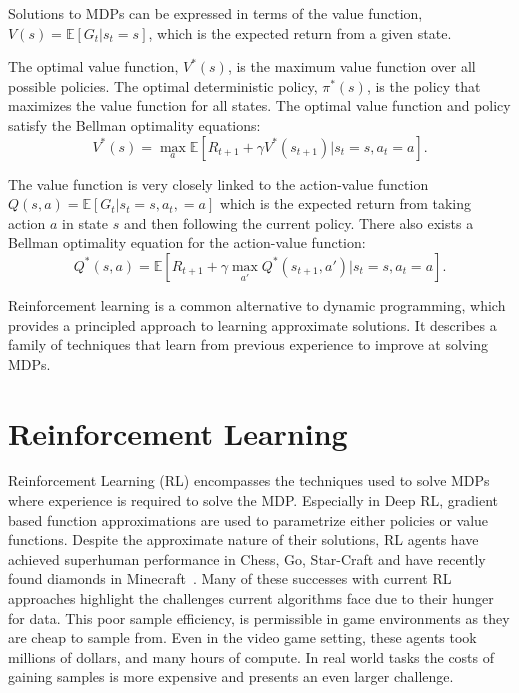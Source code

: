 Solutions to MDPs can be expressed in terms of the value function, $V(s) = \mathbb{E} [ G_t | s_t = s]$, which is the expected return from a given state.

The optimal value function, $V^*(s)$, is the maximum value function over all possible policies. The optimal deterministic policy, $\pi^*(s)$, is the policy that maximizes the value function for all states. The optimal value function and policy satisfy the Bellman optimality equations\cite{bellamn1957mdp}:
\begin{equation}
	V^*(s) = \max_a \mathbb{E} [ R_{t+1} + \gamma V^*(s_{t+1}) | s_t = s, a_t = a].
\end{equation}

The value function is very closely linked to the action-value function $Q(s, a) = \mathbb{E} [G_t | s_t=s, a_t,=a]$ which is the expected return from taking action $a$ in state $s$ and then following the current policy. There also exists a Bellman optimality equation for the action-value function:
\begin{equation}
	Q^*(s,a) = \mathbb{E} [ R_{t+1} + \gamma \max_{a'} Q^*(s_{t+1}, a') | s_t = s, a_t = a].
\end{equation}

Reinforcement learning is a common alternative to dynamic programming, which provides a principled approach to learning approximate solutions. It describes a family of techniques that learn from previous experience to improve at solving MDPs.

\section{Reinforcement Learning}
Reinforcement Learning (RL) encompasses the techniques used to solve MDPs where experience is required to solve the MDP. Especially in Deep RL, gradient based function approximations are used to parametrize either policies or value functions. Despite the approximate nature of their solutions, RL agents have achieved superhuman performance in Chess, Go, Star-Craft and have recently found diamonds in Minecraft~\cite{silver2016mastering,silver2017mastering,hafner2023mastering}. Many of these successes with current RL approaches highlight the challenges current algorithms face due to their hunger for data. This poor sample efficiency, is permissible in game environments as they are cheap to sample from. Even in the video game setting, these agents took millions of dollars, and many hours of compute. In real world tasks the costs of gaining samples is more expensive and presents an even larger challenge.


